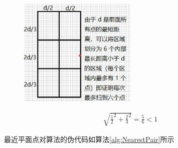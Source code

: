 \documentclass[lang=cn,11pt,a4paper]{elegantpaper}
\begin{document}
\begin{figure}[!htb]
\centering
\includegraphics[width=0.5\textwidth]{image/near.png}
\end{figure}

\[
\begin{aligned}
\sqrt{{\frac{1}{2}}^2 + {\frac{2}{3}}^2}=\frac{5}{6} < 1
\end{aligned}
\]

最近平面点对算法的伪代码如算法\ref{alg:NearestPair}所示
\end{document}
